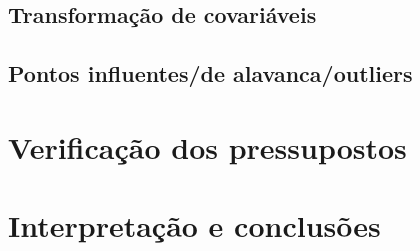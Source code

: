 \documentclass[12pt,a4paper]{article}\usepackage[]{graphicx}\usepackage[]{color}
\begin{document}
\subsection{\textbf{Transformação de covariáveis}}

\newpage
\subsection{\textbf{Pontos influentes/de alavanca/outliers}}

\newpage
\section{{\LARGE\textbf{Verificação dos pressupostos}}}

\newpage
\section{{\LARGE\textbf{Interpretação e conclusões}}}
\end{document}
